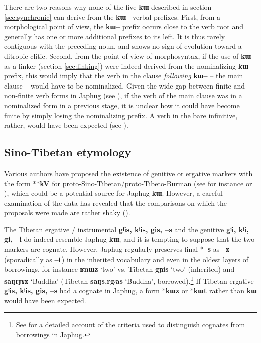 \documentclass[oldfontcommands,oneside,a4paper,11pt]{article}
\newcommand{\ipa}[1]{{\phon\textbf{#1}}}
\begin{document}
 There are two reasons why none of the five \ipa{kɯ} described in section \ref{sec:synchronic} can derive from the \ipa{kɯ--} verbal prefixes. First, from a morphological point of view, the \ipa{kɯ--} prefix occurs close to the verb root and generally has one or more additional prefixes to its left. It is thus rarely contiguous with the preceding noun, and shows no sign of evolution toward a ditropic clitic. Second, from the point of view of morphosyntax, if the use of \ipa{kɯ} as a linker (section \ref{sec:linking}) were indeed derived from the nominalizing \ipa{kɯ--} prefix, this would imply that the verb in the clause \textit{following} \ipa{kɯ--} -- the main clause -- would have to be nominalized. Given the wide gap between finite and non-finite verb forms in Japhug (see \citealt[267-272]{jacques14linking}), if the verb of the main clause was in a nominalized form in a previous stage, it is unclear how it could have become finite by simply losing the nominalizing prefix. A verb in the bare infinitive, rather, would have been expected (see  \citealt[7]{jacques14antipassive}).

 

\subsection{Sino-Tibetan etymology}
Various authors have proposed the existence of genitive or ergative markers with the form **\ipa{kV} for proto-Sino-Tibetan/proto-Tibeto-Burman (see for instance \citealt[95-6]{benedict72} or \citealt{delancey84case}), which could be a potential source for Japhug \ipa{kɯ}. However, a careful examination of the data has revealed that the comparisons on which the proposals were made are rather shaky (\citealt{lapolla95ergative}).

The Tibetan ergative / instrumental \ipa{gʲis, kʲis, gis, --s} and the genitive \ipa{gʲi, kʲi, gi, --i} do indeed resemble Japhug \ipa{kɯ}, and it is tempting to suppose that the two markers are cognate. However, Japhug regularly preserves final *\ipa{--s} as \ipa{--z} (sporadically as \ipa{--t}) in the inherited vocabulary and even in the oldest layers of borrowings, for instance \ipa{ʁnɯz} `two'  vs. Tibetan \ipa{gɲis} `two' (inherited) and \ipa{saŋrɟɤz} `Buddha' (Tibetan \ipa{saŋs.rgʲas} `Buddha', borrowed).\footnote{See \citet[83-200]{jacques04these} for a detailed account of the criteria used to distinguish cognates from borrowings in Japhug.} If Tibetan ergative \ipa{gʲis, kʲis, gis, --s} had a cognate in Japhug, a form *\ipa{kɯz} or *\ipa{kɯt} rather than \ipa{kɯ} would have been expected.
\end{document}
